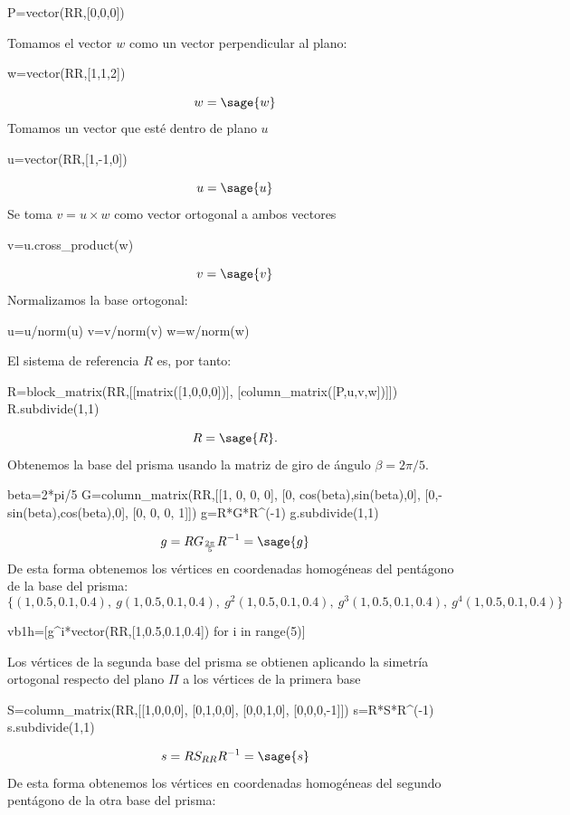 \documentclass{amsart}
\begin{document}
\begin{sageblock}
P=vector(RR,[0,0,0])
\end{sageblock}
Tomamos el vector $w$ como un vector perpendicular al plano:
\begin{sageblock}
w=vector(RR,[1,1,2])
\end{sageblock}
$$w=\sage{w}$$
Tomamos un vector que esté dentro de plano $u$
\begin{sageblock}
u=vector(RR,[1,-1,0])
\end{sageblock}
$$u=\sage{u}$$
Se toma $v=u\times w$ como vector ortogonal a ambos vectores
\begin{sageblock}
v=u.cross_product(w)
\end{sageblock}
$$v=\sage{v}$$
Normalizamos la base ortogonal:
\begin{sageblock}
u=u/norm(u)
v=v/norm(v)
w=w/norm(w)
\end{sageblock}
El sistema de referencia $R$ es, por tanto:
\begin{sageblock}
R=block_matrix(RR,[[matrix([1,0,0,0])],
                  [column_matrix([P,u,v,w])]])
R.subdivide(1,1)
\end{sageblock}
\[ R = \sage{R}. \]
Obtenemos la base del prisma usando la matriz de giro de ángulo $\beta=2\pi/5$.
\begin{sageblock}
beta=2*pi/5
G=column_matrix(RR,[[1, 0,        0,        0],
                   [0, cos(beta),sin(beta),0],
                   [0,-sin(beta),cos(beta),0],
                   [0, 0,        0,        1]])
g=R*G*R^(-1)
g.subdivide(1,1)
\end{sageblock}
$$g=RG_{\frac{2\pi}{5}}R^{-1}=\sage{g}$$
De esta forma obtenemos los vértices en coordenadas homogéneas del pentágono de la base del prisma:
$$\{(1,0.5,0.1,0.4), \ g(1,0.5,0.1,0.4), \ g^2(1,0.5,0.1,0.4), \ g^3(1,0.5,0.1,0.4), \ g^4(1,0.5,0.1,0.4) \}$$
\begin{sageblock}
vb1h=[g^i*vector(RR,[1,0.5,0.1,0.4]) for i in range(5)]
\end{sageblock}
Los vértices de la segunda base del prisma se obtienen aplicando la simetría ortogonal respecto del plano $\Pi$ a los vértices de la primera base
\begin{sageblock}
S=column_matrix(RR,[[1,0,0,0],
                   [0,1,0,0],
                   [0,0,1,0],
                   [0,0,0,-1]])
s=R*S*R^(-1)
s.subdivide(1,1)
\end{sageblock}
$$s=RS_{RR}R^{-1}=\sage{s}$$
De esta forma obtenemos los vértices en coordenadas homogéneas del segundo pentágono de la otra base del prisma:
\end{document}
